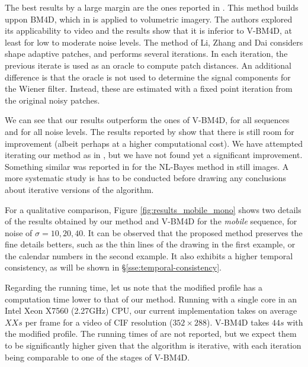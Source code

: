 \documentclass[10pt, a4paper]{article}
\newcommand{\pa}[1]{#1}
\newcommand{\padd}[1]{\pa{#1}}
\newcommand{\pcomment}[1]{}
\begin{document}
The best results by a large margin are the ones reported in
\cite{LiZhangDai2011}. This method builds uppon BM4D, which in \cite{Maggioni2013}
is applied to volumetric imagery. The authors explored its applicability to video 
and the results show that it is inferior to V-BM4D, at least 
for low to moderate noise levels. The method of Li, Zhang and Dai \cite{LiZhangDai2011} 
considers shape adaptive patches, and performs several iterations. In each iteration,
the previous iterate is used as an oracle to compute patch distances.
\padd{An additional difference is that the oracle is not used to determine the
signal components for the Wiener filter. Instead, these are estimated with a fixed
point iteration from the original noisy patches.}

We can see that our results outperform the ones of V-BM4D, for all sequences and 
for all noise levels. The results reported by \cite{LiZhangDai2011} show that there
is still room for improvement (albeit perhaps at a higher computational cost).
%
We have attempted iterating our method as in \cite{LiZhangDai2011},
but we have not found yet a significant improvement. Something similar was
reported in \cite{Lebrun2013ipol,Lebrun2013a} for the NL-Bayes method in still
images. %
A more systematic study is has to be conducted before drawing any
conclusions about iterative versions of the algorithm.

For a qualitative comparison, Figure \ref{fig:results_mobile_mono}
shows two details of the results obtained by our method and V-BM4D for the
\emph{mobile} sequence, for noise of $\sigma = 10, 20, 40$. It can be observed
that the proposed method preserves the fine details betters, such as the thin
lines of the drawing in the first example, or the calendar numbers in the
second example. It also exhibits a higher temporal consistency, as will be
shown in \S \ref{sse:temporal-consistency}.


Regarding the running time, let us note that the modified profile has a
computation time lower to that of our method. Running with a
single core in an Intel Xeon X7560 (2.27GHz) CPU, 
our current implementation takes on average $XXs$ per frame for a video of CIF
resolution ($352\times288$). V-BM4D takes $44s$ with the modified profile.
The running times of \cite{LiZhangDai2011} are not reported, but we expect them
to be significantly higher given that the algorithm is iterative, with each iteration 
being comparable to one of the stages of V-BM4D.
\pcomment{TODO: Compute running times!!!}
\pcomment{We should include computation times for grayscale videos, instead of color}
\end{document}
